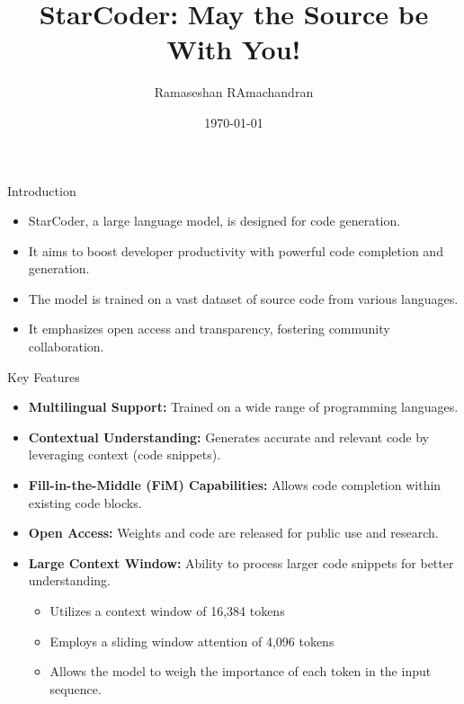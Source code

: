 

\title{StarCoder: May the Source be With You!}
\author{Ramaseshan RAmachandran}
\date{\today}



\begin{frame}
  \maketitle
\end{frame}

\begin{frame}{Introduction}
  \begin{itemize}
    \item StarCoder\cite{li2023starcodersourceyou}, a large language model, is designed for code generation.
    \item It aims to boost developer productivity with powerful code completion and generation.
    \item The model is trained on a vast dataset of source code from various languages.
    \item It emphasizes open access and transparency, fostering community collaboration.
  \end{itemize}
\end{frame}

\begin{frame}{Key Features}
  \begin{itemize}
    \item \textbf{Multilingual Support:} Trained on a wide range of programming languages.
    \item \textbf{Contextual Understanding:} Generates accurate and relevant code by leveraging context (code snippets).
    \item \textbf{Fill-in-the-Middle (FiM) Capabilities:} Allows code completion within existing code blocks.
    \item \textbf{Open Access:} Weights and code are released for public use and research.
    \item \textbf{Large Context Window:} Ability to process larger code snippets for better understanding.
    \begin{itemize}
    \item Utilizes a context window of 16,384 tokens
    \item Employs a sliding window attention of 4,096 tokens
    \item Allows the model to weigh the importance of each token in the input sequence.
    \end{itemize}
  \end{itemize}
\end{frame}

